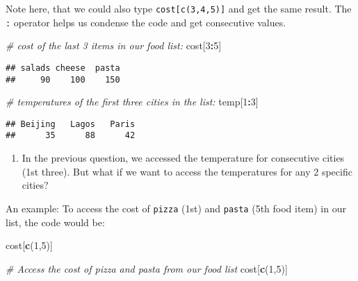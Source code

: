 \documentclass[
]{article}
\newenvironment{Shaded}{\begin{snugshade}}{\end{snugshade}}
\newcommand{\CommentTok}[1]{\textcolor[rgb]{0.56,0.35,0.01}{\textit{#1}}}
\newcommand{\DecValTok}[1]{\textcolor[rgb]{0.00,0.00,0.81}{#1}}
\newcommand{\KeywordTok}[1]{\textcolor[rgb]{0.13,0.29,0.53}{\textbf{#1}}}
\newcommand{\NormalTok}[1]{#1}
\newcommand{\OperatorTok}[1]{\textcolor[rgb]{0.81,0.36,0.00}{\textbf{#1}}}
\providecommand{\tightlist}{%
  \setlength{\itemsep}{0pt}\setlength{\parskip}{0pt}}
\begin{document}
Note here, that we could also type \texttt{cost{[}c(3,4,5){]}} and get
the same result. The \texttt{:} operator helps us condense the code and
get consecutive values.

\begin{Shaded}
\begin{Highlighting}[]
\CommentTok{# cost of the last 3 items in our food list:}
\NormalTok{cost[}\DecValTok{3}\OperatorTok{:}\DecValTok{5}\NormalTok{]}
\end{Highlighting}
\end{Shaded}

\begin{verbatim}
## salads cheese  pasta 
##     90    100    150
\end{verbatim}

\begin{Shaded}
\begin{Highlighting}[]
\CommentTok{# temperatures of the first three cities in the list:}
\NormalTok{temp[}\DecValTok{1}\OperatorTok{:}\DecValTok{3}\NormalTok{]}
\end{Highlighting}
\end{Shaded}

\begin{verbatim}
## Beijing   Lagos   Paris 
##      35      88      42
\end{verbatim}

\begin{enumerate}
\def\labelenumi{\arabic{enumi}.}
\setcounter{enumi}{4}
\tightlist
\item
  In the previous question, we accessed the temperature for consecutive
  cities (1st three). But what if we want to access the temperatures for
  any 2 specific cities?
\end{enumerate}

An example: To access the cost of \texttt{pizza} (1st) and
\texttt{pasta} (5th food item) in our list, the code would be:

\begin{Shaded}
\begin{Highlighting}[]
\NormalTok{cost[}\KeywordTok{c}\NormalTok{(}\DecValTok{1}\NormalTok{,}\DecValTok{5}\NormalTok{)]}
\end{Highlighting}
\end{Shaded}

\begin{Shaded}
\begin{Highlighting}[]
\CommentTok{# Access the cost of pizza and pasta from our food list }
\NormalTok{cost[}\KeywordTok{c}\NormalTok{(}\DecValTok{1}\NormalTok{,}\DecValTok{5}\NormalTok{)]}
\end{Highlighting}
\end{Shaded}
\end{document}
